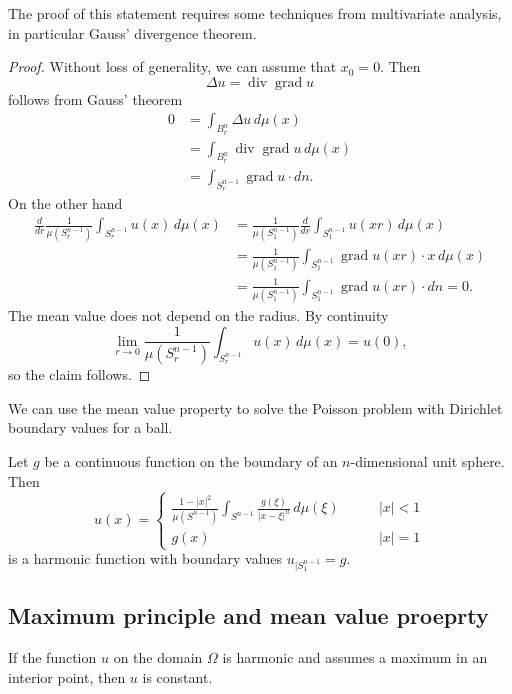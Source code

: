The proof of this statement requires some techniques from multivariate
analysis, in particular Gauss' divergence theorem.

\begin{proof}
Without loss of generality, we can assume that $x_0=0$.
Then
\[
\Delta u=\operatorname{div}\operatorname{grad}u
\]
follows from Gauss' theorem
\begin{align*}
0&=\int_{B_r^n}\Delta u\,d\mu(x)
\\
&=\int_{B_r^n}\operatorname{div}\operatorname{grad}u\,d\mu(x)
\\
&=\int_{S_r^{n-1}} \operatorname{grad}u\cdot dn.
\end{align*}
On the other hand
\begin{align*}
\frac{d}{dr}\frac{1}{\mu(S_r^{n-1})}\int_{S_r^{n-1}} u(x)\,d\mu(x)
&=
\frac1{\mu(S_1^{n-1})}\frac{d}{dr}\int_{S_1^{n-1}}u(xr)\,d\mu(x)
\\
&=
\frac1{\mu(S_1^{n-1})}\int_{S_1^{n-1}}\operatorname{grad}u(xr)\cdot x
\,d\mu(x)
\\
&=
\frac1{\mu(S_1^{n-1})}\int_{S_1^{n-1}}\operatorname{grad}u(xr)\cdot dn=0.
\end{align*}
The mean value does not depend on the radius.
By continuity
\[
\lim_{r\to 0}\frac1{\mu(S_r^{n-1})}\int_{S_r^{n-1}}u(x)\,d\mu(x)=u(0),
\]
so the claim follows.
\end{proof}

We can use the mean value property to solve the Poisson problem with
Dirichlet boundary values for a ball.

\begin{satz}
Let $g$ be a continuous function on the boundary of an $n$-dimensional
unit sphere.
Then
\[
u(x)=\begin{cases}
\displaystyle \frac{1-|x|^2}{\mu(S^{n-1})}
\int_{S^{n-1}}\frac{g(\xi)}{|x-\xi|^n}\,d\mu(\xi)&\qquad |x|<1\\
g(x)&\qquad |x|=1
\end{cases}
\]
is a harmonic function with boundary values $u_{|S_1^{n-1}}=g$.
\end{satz}

\subsection{Maximum principle and mean value proeprty}
\begin{satz}
If the function $u$ on the domain
$\Omega$
is harmonic and assumes a maximum in an interior point,
then $u$ is constant.
\end{satz}

